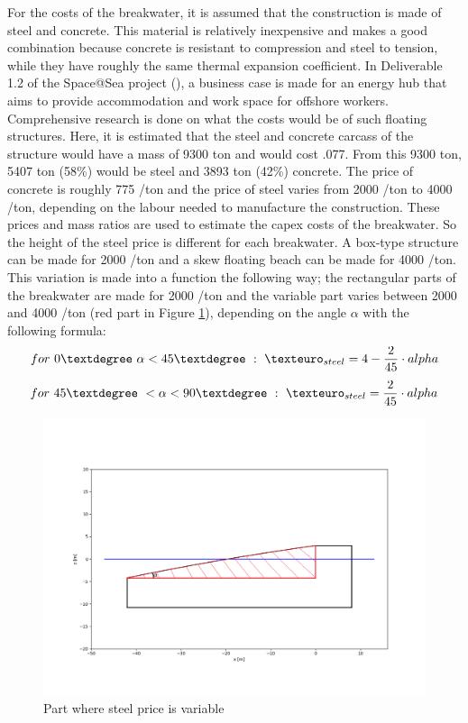 For the costs of the breakwater, it is assumed that the construction is made of steel and concrete. This material is relatively inexpensive and makes a good combination because concrete is resistant to compression and steel to tension, while they have roughly the same thermal expansion coefficient. In Deliverable 1.2 of the Space@Sea project (\cite{Adam2017D1.2S@S}), a business case is made for an energy hub that aims to provide accommodation and work space for offshore workers. Comprehensive research is done on what the costs would be of such floating structures. Here, it is estimated that the steel and concrete carcass of the structure would have a mass of 9300 ton and would cost .077. From this 9300 ton, 5407 ton (58\%) would be steel and 3893 ton (42\%) concrete. The price of concrete is roughly 775 \texteuro/ton and the price of steel varies from 2000 \texteuro/ton to 4000 \texteuro/ton, depending on the labour needed to manufacture the construction. These prices and mass ratios are used to estimate the \acrshort{capex} costs of the breakwater. So the height of the steel price is different for each breakwater. A box-type structure can be made for 2000 \texteuro/ton and a skew floating beach can be made for 4000 \texteuro/ton. This variation is made into a function the following way; the rectangular parts of the breakwater are made for 2000 \texteuro/ton and the variable part varies between 2000 and 4000 \texteuro/ton (red part in Figure \ref{fig: steel price breakwater}), depending on the angle $\alpha$ with the following formula:
\begin{equation}
    for ~ 0\textdegree ~\alpha<45 \textdegree~:~ \texteuro_{steel} = 4 - \frac{2}{45} \cdot alpha
\end{equation}
\begin{equation}
        for ~ 45\textdegree~<\alpha<90\textdegree ~:~\texteuro_{steel} =\frac{2}{45} \cdot alpha
\end{equation}
\begin{figure}
    \centering
    \includegraphics[width=0.5\linewidth]{figures/Costs/breakwater_1.png}
    \caption{Part where steel price is variable}
    \label{fig: steel price breakwater}
\end{figure}
